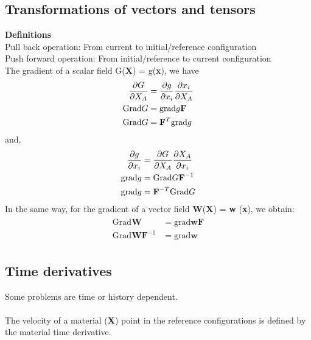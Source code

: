 \documentclass[12pt,3p]{article}
\numberwithin{equation}{section}
\begin{document}
\subsection{Transformations of vectors and tensors}
\textbf{Definitions} \\ 
Pull back operation: From current to initial/reference configuration \\
Push forward operation: From initial/reference to current configuration \\ 

The gradient of a scalar field G(\textbf{X}) = g(\textbf{x}), we have 
\begin{align}\label{323}
\begin{split}
\pdv{G}{X_A} &= \pdv{g}{x_i} \pdv{x_i}{X_A} \\
\text{Grad} G &= \text{grad} g \mathbf{F} \\
\text{Grad} G &= \mathbf{F}^T \text{grad} g
\end{split}
\end{align}
and,
\begin{align}\label{324}
\begin{split}
\pdv{g}{x_i} &= \pdv{G}{X_A} \pdv{X_A}{x_i} \\
\text{grad} g &= \text{Grad} G \mathbf{F}^{-1} \\
\text{grad} g &= \mathbf{F}^{-T}\text{Grad} G
\end{split}
\end{align}
In the same way, for the gradient of a vector field \textbf{W}(\textbf{X}) = \textbf{w} (\textbf{x}), we obtain:
\begin{align}\label{325}
\begin{split}
\text{Grad} \mathbf{W} &= \text{grad} \mathbf{w} \mathbf{F} \\ 
\text{Grad} \mathbf{W} \mathbf{F}^{-1} &= \text{grad} \mathbf{w}
\end{split}
\end{align}

\subsection{Time derivatives}
Some problems are time or history dependent. \\ \\
The velocity of a material (\textbf{X}) point in the reference configurations is defined by the material time derivative. 
\begin{align}
\begin{split}
\end{split}
\end{align}
\end{document}
